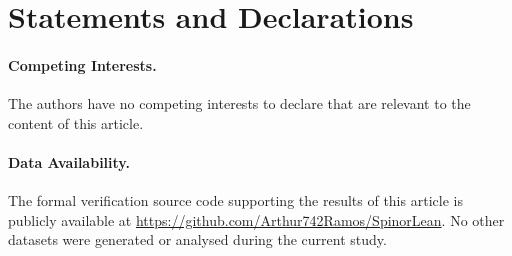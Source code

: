 \documentclass{birkjour}
\theoremstyle{plain}
\theoremstyle{definition}
\theoremstyle{remark}
\numberwithin{equation}{section}
\begin{document}
\section*{Statements and Declarations}

\paragraph{Competing Interests.}
The authors have no competing interests to declare that are relevant to the
content of this article.

\paragraph{Data Availability.}
The formal verification source code supporting the results of this article is
publicly available at \url{https://github.com/Arthur742Ramos/SpinorLean}.
No other datasets were generated or analysed during the current study.



\end{document}
